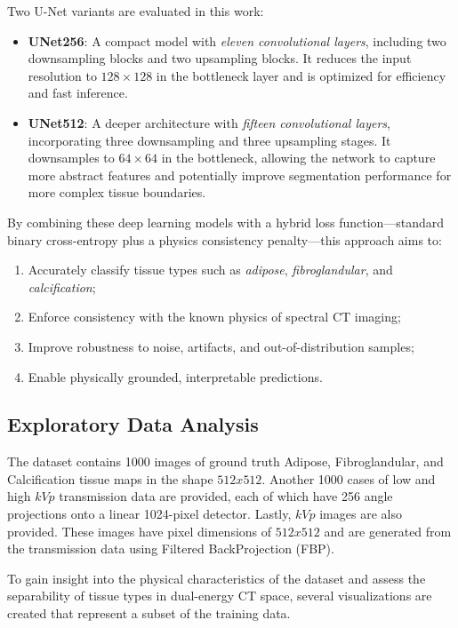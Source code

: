 Two U-Net variants are evaluated in this work:
\begin{itemize}
  \item \textbf{UNet256}: A compact model with \emph{eleven convolutional layers}, including two 
    downsampling blocks and two upsampling blocks. It reduces the input resolution 
    to $128 \times 128$ in the bottleneck layer and is optimized for efficiency and 
    fast inference.
  \item \textbf{UNet512}: A deeper architecture with \emph{fifteen convolutional layers}, 
    incorporating three downsampling and three upsampling stages. It downsamples to $64 \times 64$ 
    in the bottleneck, allowing the network to capture more abstract features and potentially 
    improve segmentation performance for more complex tissue boundaries.
\end{itemize}

By combining these deep learning models with a hybrid loss function—standard binary cross-entropy 
plus a physics consistency penalty—this approach aims to:

\begin{enumerate}
  \item Accurately classify tissue types such as \emph{adipose}, \emph{fibroglandular}, and \emph{calcification};
  \item Enforce consistency with the known physics of spectral CT imaging;
  \item Improve robustness to noise, artifacts, and out-of-distribution samples;
  \item Enable physically grounded, interpretable predictions.
\end{enumerate}

\subsection{Exploratory Data Analysis}\label{sec:exploratory_data_analysis}

The dataset contains 1000 images of ground truth Adipose, Fibroglandular, and Calcification tissue 
maps in the shape $512x512$. Another 1000 cases of low and high $kVp$ transmission data are provided, 
each of which have 256 angle projections onto a linear 1024-pixel detector. Lastly, $kVp$ images
are also provided. These images have pixel dimensions of $512x512$ and are generated from the 
transmission data using Filtered BackProjection (FBP). 

To gain insight into the physical characteristics of the dataset and assess the separability of tissue types in
dual-energy CT space, several visualizations are created that represent a subset of the training data.

